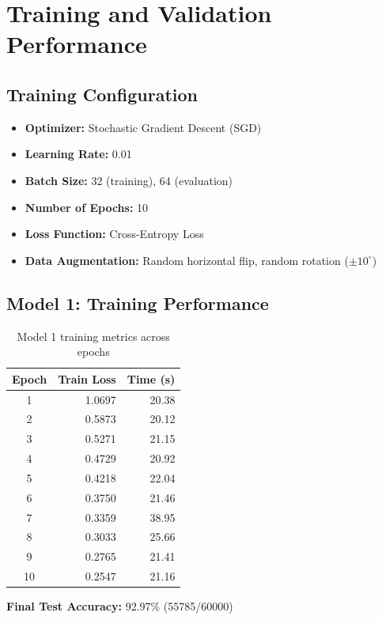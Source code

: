 \documentclass[11pt,a4paper]{article}
\begin{document}
\section{Training and Validation Performance}

\subsection{Training Configuration}
\begin{itemize}
    \item \textbf{Optimizer:} Stochastic Gradient Descent (SGD)
    \item \textbf{Learning Rate:} 0.01
    \item \textbf{Batch Size:} 32 (training), 64 (evaluation)
    \item \textbf{Number of Epochs:} 10
    \item \textbf{Loss Function:} Cross-Entropy Loss
    \item \textbf{Data Augmentation:} Random horizontal flip, random rotation ($\pm 10^\circ$)
\end{itemize}

\subsection{Model 1: Training Performance}
\begin{table}[H]
\centering
\begin{tabular}{crr}
\toprule
\textbf{Epoch} & \textbf{Train Loss} & \textbf{Time (s)} \\
\midrule
1 & 1.0697 & 20.38 \\
2 & 0.5873 & 20.12 \\
3 & 0.5271 & 21.15 \\
4 & 0.4729 & 20.92 \\
5 & 0.4218 & 22.04 \\
6 & 0.3750 & 21.46 \\
7 & 0.3359 & 38.95 \\
8 & 0.3033 & 25.66 \\
9 & 0.2765 & 21.41 \\
10 & 0.2547 & 21.16 \\
\bottomrule
\end{tabular}
\caption{Model 1 training metrics across epochs}
\end{table}

\textbf{Final Test Accuracy:} 92.97\% (55785/60000)
\end{document}
